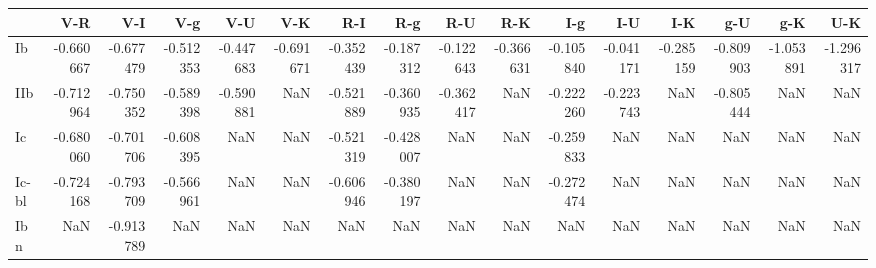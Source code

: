 \begin{tabular}{lrrrrrrrrrrrrrrr}
\toprule
{} &       V-R &       V-I &       V-g &       V-U &       V-K &       R-I &       R-g &       R-U &       R-K &       I-g &       I-U &       I-K &       g-U &       g-K &       U-K \\
\midrule
Ib    & -0.660667 & -0.677479 & -0.512353 & -0.447683 & -0.691671 & -0.352439 & -0.187312 & -0.122643 & -0.366631 & -0.105840 & -0.041171 & -0.285159 & -0.809903 & -1.053891 & -1.296317 \\
IIb   & -0.712964 & -0.750352 & -0.589398 & -0.590881 &       NaN & -0.521889 & -0.360935 & -0.362417 &       NaN & -0.222260 & -0.223743 &       NaN & -0.805444 &       NaN &       NaN \\
Ic    & -0.680060 & -0.701706 & -0.608395 &       NaN &       NaN & -0.521319 & -0.428007 &       NaN &       NaN & -0.259833 &       NaN &       NaN &       NaN &       NaN &       NaN \\
Ic-bl & -0.724168 & -0.793709 & -0.566961 &       NaN &       NaN & -0.606946 & -0.380197 &       NaN &       NaN & -0.272474 &       NaN &       NaN &       NaN &       NaN &       NaN \\
Ibn   &       NaN & -0.913789 &       NaN &       NaN &       NaN &       NaN &       NaN &       NaN &       NaN &       NaN &       NaN &       NaN &       NaN &       NaN &       NaN \\
\bottomrule
\end{tabular}
